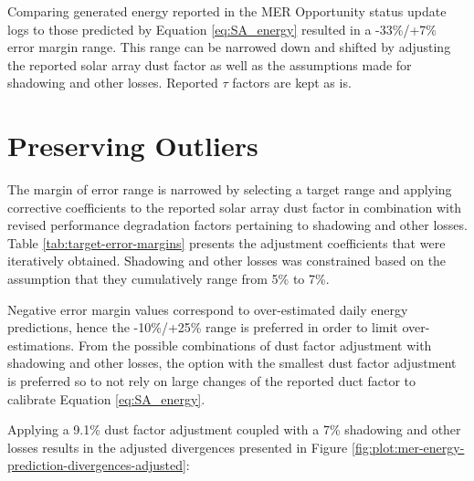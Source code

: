 Comparing generated energy reported in the \ac{MER} Opportunity status update logs to those predicted by Equation \ref{eq:SA_energy} resulted in a -33\%/+7\% error margin range. This range can be narrowed down and shifted by adjusting the reported solar array dust factor as well as the assumptions made for shadowing and other losses. Reported $\tau$ factors are kept as is.

\section{Preserving Outliers}
\label{sec:Appendix:NarrowedEnergyPredictionErrorMarginRange:PreservingOutliers}

The margin of error range is narrowed by selecting a target range and applying corrective coefficients to the reported solar array dust factor in combination with revised performance degradation factors pertaining to shadowing and other losses. Table \ref{tab:target-error-margins} presents the adjustment coefficients that were iteratively obtained. Shadowing and other losses was constrained based on the assumption that they cumulatively range from 5\% to 7\%.

Negative error margin values correspond to over-estimated daily energy predictions, hence the -10\%/+25\% range is preferred in order to limit over-estimations. From the possible combinations of dust factor adjustment with shadowing and other losses, the option with the smallest dust factor adjustment is preferred so to not rely on large changes of the reported duct factor to calibrate Equation \ref{eq:SA_energy}.



\clearpage
Applying a 9.1\% dust factor adjustment coupled with a 7\% shadowing and other losses results in the adjusted divergences presented in Figure \ref{fig:plot:mer-energy-prediction-divergences-adjusted}:

